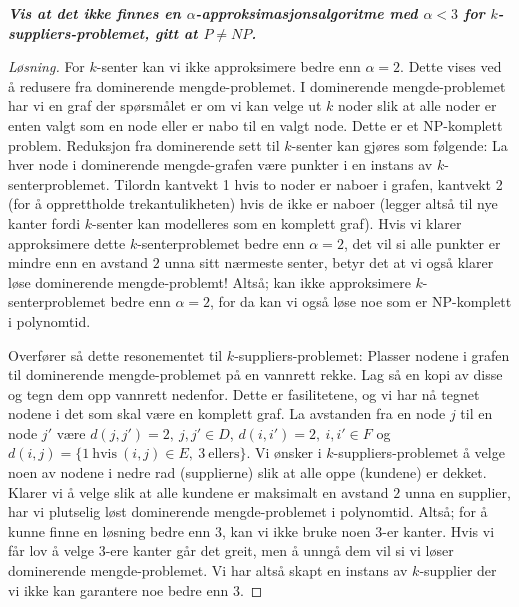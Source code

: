\documentclass[12pt]{article}
\newenvironment{solution}{\begin{proof}[Løsning]}{\end{proof}}
\begin{document}
\it{\textbf{Vis at det ikke finnes en $\alpha$-approksimasjonsalgoritme med $\alpha < 3$ for $k$-suppliers-problemet, gitt at $P \neq NP$.}}
\begin{solution}
For $k$-senter kan vi ikke approksimere bedre enn $\alpha  = 2$. Dette vises ved å redusere fra dominerende mengde-problemet. I dominerende mengde-problemet har vi en graf der spørsmålet er om vi kan velge ut $k$ noder slik at alle noder er enten valgt som en node eller er nabo til en valgt node. Dette er et NP-komplett problem. Reduksjon fra dominerende sett  til $k$-senter kan gjøres som følgende: La hver node i dominerende mengde-grafen være punkter i en instans av $k$-senterproblemet. Tilordn kantvekt 1 hvis to noder er naboer i grafen, kantvekt 2 (for å opprettholde trekantulikheten) hvis de ikke er naboer (legger altså til nye kanter fordi $k$-senter kan modelleres som en komplett graf). Hvis vi klarer approksimere dette $k$-senterproblemet bedre enn $\alpha = 2$, det vil si alle punkter er mindre enn en avstand $2$ unna sitt nærmeste senter, betyr det at vi også klarer løse dominerende mengde-problemt! Altså; kan ikke approksimere $k$-senterproblemet bedre enn $\alpha = 2$, for da kan vi også løse noe som er NP-komplett i polynomtid.

Overfører så dette resonementet til $k$-suppliers-problemet: Plasser nodene i grafen til dominerende mengde-problemet på en vannrett rekke. Lag så en kopi av disse og tegn dem opp vannrett nedenfor. Dette er fasilitetene, og vi har nå tegnet nodene i det som skal være en komplett graf. La avstanden fra en node $j$ til en node $j'$ være $d(j, j') = 2, ~j,j' \in D$, $d(i, i') = 2, ~i,i' \in F$ og $d(i, j) = \{1 ~\textrm{hvis} ~(i, j) \in E,~ 3 ~\textrm{ellers}\}$. Vi ønsker i $k$-suppliers-problemet å velge noen av nodene i nedre rad (supplierne) slik at alle oppe (kundene) er dekket. Klarer vi å velge slik at alle kundene er maksimalt en avstand $2$ unna en supplier, har vi plutselig løst dominerende mengde-problemet i polynomtid. Altså; for å kunne finne en løsning bedre enn $3$, kan vi ikke bruke noen $3$-er kanter. Hvis vi får lov å velge $3$-ere kanter går det greit, men å unngå dem vil si vi løser dominerende mengde-problemet. Vi har altså skapt en instans av $k$-supplier der vi ikke kan garantere noe bedre enn 3.
\end{solution}
\end{document}
